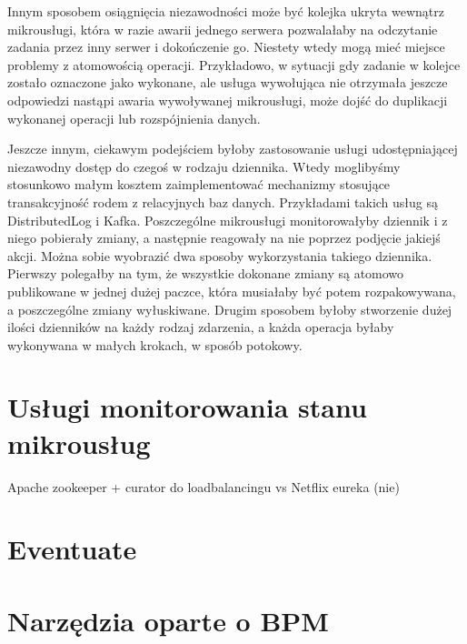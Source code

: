 \documentclass[licencjacka]{pracamgr}
\begin{document}
Innym sposobem osiągnięcia niezawodności może być kolejka ukryta wewnątrz mikrousługi, która w razie awarii jednego serwera pozwalałaby na odczytanie zadania przez inny serwer i dokończenie go. Niestety wtedy mogą mieć miejsce problemy z atomowością operacji. Przykładowo, w sytuacji gdy zadanie w kolejce zostało oznaczone jako wykonane, ale usługa wywołująca nie otrzymała jeszcze odpowiedzi nastąpi awaria wywoływanej mikrousługi, może dojść do duplikacji wykonanej operacji lub rozspójnienia danych.

Jeszcze innym, ciekawym podejściem byłoby zastosowanie usługi udostępniającej niezawodny dostęp do czegoś w rodzaju dziennika. Wtedy moglibyśmy stosunkowo małym kosztem zaimplementować mechanizmy stosujące transakcyjność rodem z relacyjnych baz danych. Przykładami takich usług są DistributedLog i Kafka. Poszczególne mikrousługi monitorowałyby dziennik i z niego pobierały zmiany, a następnie reagowały na nie poprzez podjęcie jakiejś akcji. Można sobie wyobrazić dwa sposoby wykorzystania takiego dziennika. Pierwszy polegałby na tym, że wszystkie dokonane zmiany są atomowo publikowane w jednej dużej paczce, która musiałaby być potem rozpakowywana, a poszczególne zmiany wyłuskiwane. Drugim sposobem byłoby stworzenie dużej ilości dzienników na każdy rodzaj zdarzenia, a każda operacja byłaby wykonywana w małych krokach, w sposób potokowy.

\section{Usługi monitorowania stanu mikrousług}
Apache zookeeper + curator do loadbalancingu vs Netflix eureka (nie) %

\section{Eventuate}

\section{Narzędzia oparte o BPM}
\end{document}
